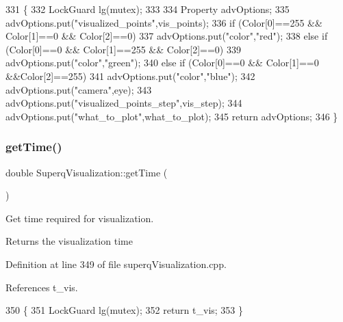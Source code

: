 \begin{DoxyCode}
331 \{
332     LockGuard lg(mutex);
333 
334     Property advOptions;
335     advOptions.put(\textcolor{stringliteral}{"visualized\_points"},vis_points);
336     \textcolor{keywordflow}{if} (Color[0]==255 && Color[1]==0 && Color[2]==0)
337         advOptions.put(\textcolor{stringliteral}{"color"},\textcolor{stringliteral}{"red"});
338     \textcolor{keywordflow}{else} \textcolor{keywordflow}{if}  (Color[0]==0 && Color[1]==255 && Color[2]==0)
339         advOptions.put(\textcolor{stringliteral}{"color"},\textcolor{stringliteral}{"green"});
340     \textcolor{keywordflow}{else} \textcolor{keywordflow}{if}  (Color[0]==0 && Color[1]==0 &&Color[2]==255)
341         advOptions.put(\textcolor{stringliteral}{"color"},\textcolor{stringliteral}{"blue"});
342     advOptions.put(\textcolor{stringliteral}{"camera"},eye);
343     advOptions.put(\textcolor{stringliteral}{"visualized\_points\_step"},vis_step);
344     advOptions.put(\textcolor{stringliteral}{"what\_to\_plot"},what_to_plot);
345     \textcolor{keywordflow}{return} advOptions;
346 \}
\end{DoxyCode}
\mbox{\label{classSuperqVisualization_a9583b378f68f466a76022817d3051c6e}} 
\subsubsection{\texorpdfstring{get\+Time()}{getTime()}}
{\footnotesize\ttfamily double Superq\+Visualization\+::get\+Time (\begin{DoxyParamCaption}{ }\end{DoxyParamCaption})}



Get time required for visualization. 

\begin{DoxyReturn}{Returns}
the visualization time 
\end{DoxyReturn}


Definition at line 349 of file superq\+Visualization.\+cpp.



References t\+\_\+vis.


\begin{DoxyCode}
350 \{   
351     LockGuard lg(mutex);
352     \textcolor{keywordflow}{return} t_vis;
353 \}
\end{DoxyCode}
\mbox{\label{classSuperqVisualization_a82eb6b92c07720b35c714a3c8e2f88a3}} 
